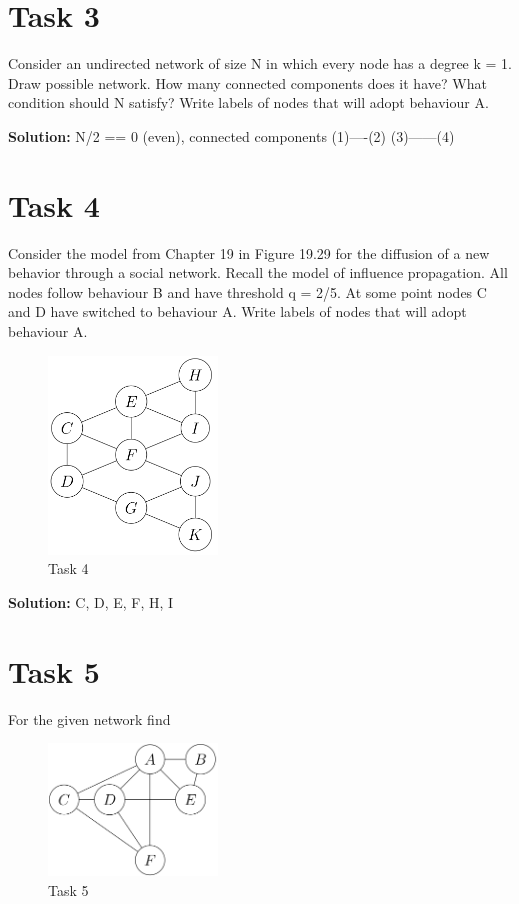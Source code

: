 \documentclass{cernatsnote}
\begin{document}
\section{Task 3} 
Consider an undirected network of size N in which every node has a degree k = 1. Draw possible network. How many connected components does it have? What condition should N satisfy? Write labels of nodes that will adopt behaviour A.

\textbf{Solution:} N/2 == 0 (even), connected components  (1)----(2)   (3)------(4)
\section{Task 4} 
Consider the model from Chapter 19 in Figure 19.29 \cite{task4} for the diffusion of a new behavior through a social network. Recall the model of influence propagation. All nodes follow behaviour B and have threshold q = 2/5. At some point nodes C and D have switched to behaviour A. Write labels of nodes that will adopt behaviour A.

\begin{figure}[h]
\centering
\includegraphics[width=0.4\textwidth]{images/task4.png}
\caption{\label{fig:task4} Task 4}
\end{figure}

\textbf{Solution:} C, D, E, F, H, I
\section{Task 5} 
For the given network find

\begin{figure}[h]
\centering
\includegraphics[width=0.4\textwidth]{images/task5.png}
\caption{\label{fig:task5} Task 5}
\end{figure}
\end{document}
